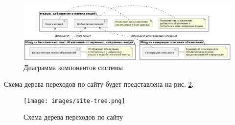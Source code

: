 \begin{figure}[htb]
	\centering
	\includegraphics[width=.9\textwidth]{images/full-diagram.png}
	\parskip=6pt
	\caption{Диаграмма компонентов системы}
	\label{fig:system-componets}
\end{figure}

Схема дерева переходов по сайту будет представлена на рис. \ref{fig:site-tree}.

\begin{figure}[htb]
	\centering
	\texttt{[image: images/site-tree.png]}
	\parskip=6pt
	\caption{Схема дерева переходов по сайту}
	\label{fig:site-tree}
\end{figure}

